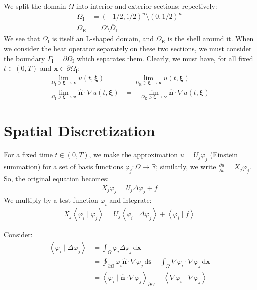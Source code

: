 \documentclass{article}
\newcommand{\bvec}[1]{\boldsymbol{#1}}
\newcommand{\brvec}[1]{\mathbf{#1}}
\newcommand{\dd}{\mathrm{d}}
\begin{document}
We split the domain $\Omega$ into interior and exterior sections; repectively:
\begin{align*}
    \Omega_\text{I} & = (-1/2, 1/2)^n \setminus (0, 1/2)^n \\
    \Omega_\text{E} & = \Omega \setminus \overline{\Omega}_\text{I}
\end{align*}
\noindent We see that $\Omega_\text{I}$ is itself an L-shaped domain,
and $\Omega_\text{E}$ is the shell around it.
When we consider the heat operator separately on these two sections,
we must consider the boundary $\Gamma_\text{I} = \partial \Omega_\text{I}$ which separates them.
Clearly, we must have, for all fixed $t \in (0, T)$ and $\bvec{x} \in \partial \Omega_\text{I}$:
\begin{align*}
    \lim_{\Omega_\text{I} \ni \bvec{\xi} \rightarrow \bvec{x}} u(t, \bvec{\xi})
        & = \lim_{\Omega_\text{E} \ni \bvec{\xi} \rightarrow \bvec{x}} u(t, \bvec{\xi}) \\
    \lim_{\Omega_\text{I} \ni \bvec{\xi} \rightarrow \bvec{x}} \hat{\brvec{n}} \cdot \nabla u(t, \bvec{\xi})
        & = -\lim_{\Omega_\text{E} \ni \bvec{\xi} \rightarrow \bvec{x}} \hat{\brvec{n}} \cdot \nabla u(t, \bvec{\xi})
\end{align*}

\newpage
\section{Spatial Discretization}

For a fixed time $t \in (0, T)$,
we make the approximation $u = U_j \varphi_j$ (Einstein summation)
for a set of basis functions $\varphi_j : \Omega \rightarrow \mathbb{R}$;
similarly, we write $\frac{\partial u}{\partial t} = X_j \varphi_j$.
So, the original equation becomes:
\begin{align*}
    X_j \varphi_j = U_j \Delta \varphi_j + f
\end{align*}
\noindent We multiply by a test function $\varphi_i$ and integrate:
\begin{align*}
    X_j \left< \varphi_i \mid \varphi_j \right>
        = U_j \left< \varphi_i \mid \Delta \varphi_j \right>
            + \left< \varphi_i \mid f \right>
\end{align*}

Consider:
\begin{align*}
    \left< \varphi_i \mid \Delta \varphi_j \right>
        & = \int_\Omega \varphi_i \Delta \varphi_j \, \dd \bvec{x} \\
        & = \oint_{\partial \Omega} \varphi_i \hat{\brvec{n}} \cdot \nabla \varphi_j \, \dd \bvec{s}
            - \int_\Omega \nabla \varphi_i \cdot \nabla \varphi_j \, \dd \bvec{x} \\
        & = \left< \varphi_i \mid \hat{\brvec{n}} \cdot \nabla \varphi_j \right>_{\partial \Omega}
            - \left< \nabla \varphi_i \mid \nabla \varphi_j \right>
\end{align*}
\end{document}
